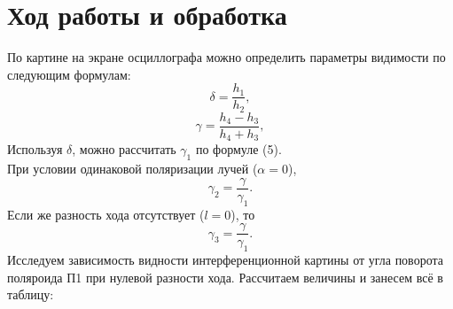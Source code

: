 \documentclass[a4paper, 12pt]{article}
\begin{document}
\section{Ход работы и обработка}

По картине на экране осциллографа можно определить параметры видимости по следующим формулам:
\begin{equation}
\delta = \dfrac{h_1}{h_2},
\end{equation}
\begin{equation}
\gamma = \dfrac{h_4 - h_3}{h_4 + h_3},
\end{equation}
Используя $\delta$, можно рассчитать $\gamma_1$ по формуле (5).\\ 
При условии одинаковой поляризации лучей ($\alpha = 0$),
\begin{equation}
\gamma_2 = \dfrac{\gamma}{\gamma_1}.
\end{equation}
Если же разность хода отсутствует ($l = 0$), то
\begin{equation}
\gamma_3 = \dfrac{\gamma}{\gamma_1}.
\end{equation}
Исследуем зависимость видности интерференционной картины от угла поворота поляроида П1 при нулевой разности хода. Рассчитаем величины и занесем всё в таблицу:
\end{document}
